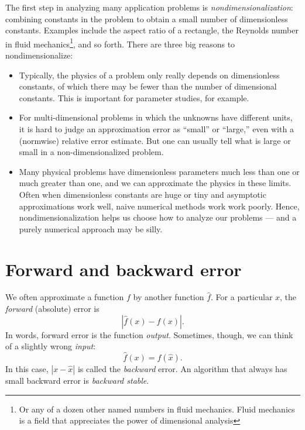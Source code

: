\documentclass[12pt, leqno]{article} %
\begin{document}
The first step in analyzing many application problems is
{\em nondimensionalization}: combining constants in the
problem to obtain a small number of dimensionless constants.
Examples include the aspect ratio of a rectangle,
the Reynolds number in fluid mechanics\footnote{%
Or any of a dozen other named numbers in fluid mechanics.  Fluid
mechanics is a field that appreciates the power of dimensional
analysis}, and so forth.  There are three big reasons to
nondimensionalize:
\begin{itemize}
\item
  Typically, the physics of a problem only really depends on
  dimensionless constants, of which there may be fewer than
  the number of dimensional constants.  This is important
  for parameter studies, for example.
\item
  For multi-dimensional problems in which the unknowns have different
  units, it is hard to judge an approximation error as ``small'' or
  ``large,'' even with a (normwise) relative error estimate.  But one
  can usually tell what is large or small in a non-dimensionalized
  problem.
\item
  Many physical problems have dimensionless parameters much less than
  one or much greater than one, and we can approximate the physics in
  these limits.  Often when dimensionless constants are huge or tiny
  and asymptotic approximations work well, naive numerical methods
  work work poorly.  Hence, nondimensionalization helps us choose how
  to analyze our problems --- and a purely numerical approach may be
  silly.
\end{itemize}

\section{Forward and backward error}

We often approximate a function $f$ by another function $\hat{f}$.
For a particular $x$, the {\em forward} (absolute) error is
\[
  |\hat{f}(x)-f(x)|.
\]
In words, forward error is the function {\em output}.  Sometimes,
though, we can think of a slightly wrong {\em input}:
\[
  \hat{f}(x) = f(\hat{x}).
\]
In this case, $|x-\hat{x}|$ is called the {\em backward} error.
An algorithm that always has small backward error is {\em backward stable}.
\end{document}

